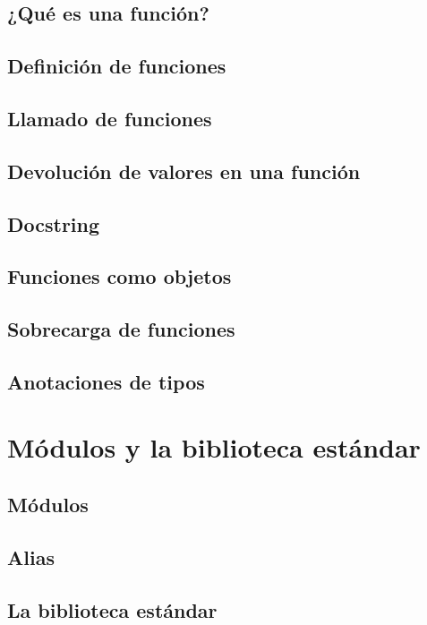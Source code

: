 \documentclass{article}
\begin{document}
\subsection{¿Qué es una función?}

\subsection{Definición de funciones}

\subsection{Llamado de funciones}

\subsection{Devolución de valores en una función}

\subsection{Docstring}

\subsection{Funciones como objetos}

\subsection{Sobrecarga de funciones}

\subsection{Anotaciones de tipos}

\newpage\section{Módulos y la biblioteca estándar}

\subsection{Módulos}

\subsection{Alias}

\subsection{La biblioteca estándar}
\end{document}
